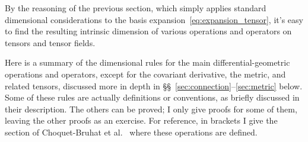 \documentclass[\ifafour a4paper,12pt,\else a5paper,10pt,\fi%
onecolumn,oneside,article,%
british%
]{memoir}
\theoremstyle{remark}
\theoremstyle{innote}
\newcommand*{\citey}{\parencites*}%
\renewcommand*{\|}[1][]{\nonscript\,#1\vert\nonscript\;\mathopen{}}
\newcommand*{\sects}{\S\S}%
\newcommand*{\etal}{{et al.}}
\begin{document}
By the reasoning of the previous section, which simply applies standard
dimensional considerations to the basis
expansion~\eqref{eq:expansion_tensor}, it's easy to find the resulting
intrinsic dimension of various operations and operators on tensors and
tensor fields.

Here is a summary of the dimensional rules for the main
differential-geometric operations and operators, except for the covariant
derivative, the metric, and related tensors, discussed more in depth in
\sects~\ref{sec:connection}--\ref{sec:metric} below. Some of these rules
are actually definitions or conventions, as briefly discussed in their
description. The others can be proved; I only give proofs for some of them,
leaving the other proofs as an exercise. For reference, in brackets I give
the section of Choquet-Bruhat \etal\ \citey{choquetbruhatetal1977_r1996}
where these operations are defined.
\end{document}
